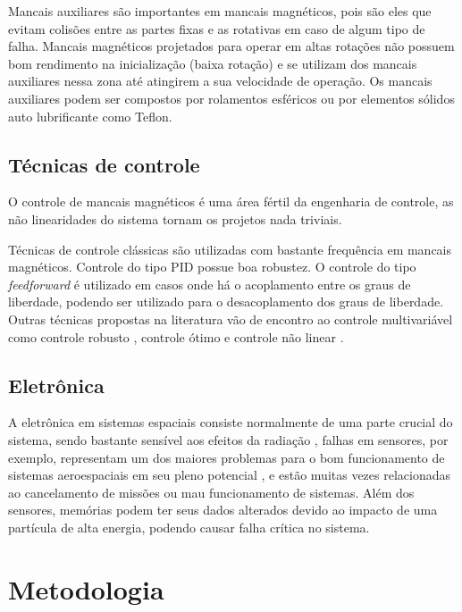  Mancais auxiliares são importantes em mancais magnéticos, pois são eles que evitam colisões entre as partes fixas e as rotativas em caso de algum tipo de falha. Mancais magnéticos projetados para operar em altas rotações não possuem bom rendimento na inicialização  (baixa rotação) e se utilizam dos mancais auxiliares nessa zona até atingirem a sua velocidade de operação. Os mancais auxiliares podem ser compostos por rolamentos esféricos \citep{Sun2004a} ou por elementos sólidos auto lubrificante como Teflon.
 
\subsection{Técnicas de controle}

O controle de mancais magnéticos é uma área fértil da engenharia de controle, as não linearidades do sistema tornam os projetos nada triviais.  

Técnicas de controle clássicas são utilizadas com bastante frequência em mancais magnéticos. Controle do tipo PID \citep{Tezuka2013} possue boa robustez. O controle  do tipo \textit{feedforward} é utilizado em casos onde há o acoplamento entre os graus de liberdade, podendo ser utilizado para o desacoplamento dos graus de liberdade. Outras técnicas propostas na literatura vão de encontro ao controle multivariável como controle robusto \citep{Jimenez-Lizafrraga2007}, controle ótimo \citep{Schuhmann2012} e controle não linear \citep{Rundell1996}.

\subsection{Eletrônica}

A eletrônica em sistemas espaciais consiste normalmente de uma parte crucial do sistema, sendo bastante sensível aos efeitos da radiação \citep{Stassinopoulos1988}, falhas em sensores, por exemplo, representam um dos maiores problemas para o bom funcionamento de sistemas aeroespaciais em seu pleno potencial \citep{Balaban2009}, e estão muitas vezes relacionadas ao cancelamento de missões ou mau funcionamento de sistemas. Além dos sensores, memórias podem ter seus dados alterados devido ao impacto de uma partícula de alta energia, podendo causar falha crítica no sistema.

\section{Metodologia}

